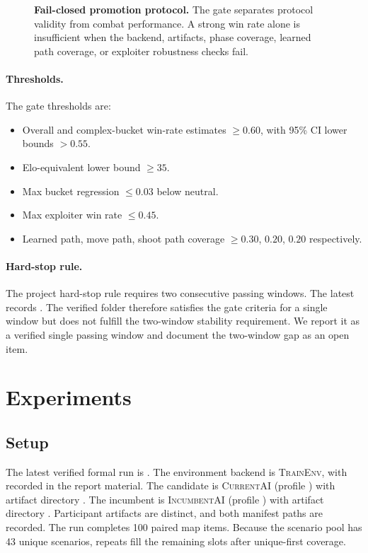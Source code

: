 \documentclass{article}
\newcommand{\env}{\textsc{TrainEnv}}
\newcommand{\currentai}{\textsc{CurrentAI}}
\newcommand{\incumbentai}{\textsc{IncumbentAI}}
\begin{document}
\begin{figure}[t]
  \centering
  
  \caption{\textbf{Fail-closed promotion protocol.} The gate separates protocol validity from combat performance. A strong win rate alone is insufficient when the backend, artifacts, phase coverage, learned path coverage, or exploiter robustness checks fail.}
  \label{fig:gate}
\end{figure}

\paragraph{Thresholds.}
The gate thresholds are:
\begin{itemize}
  \item Overall and complex-bucket win-rate estimates $\geq 0.60$, with 95\% CI lower bounds $> 0.55$.
  \item Elo-equivalent lower bound $\geq 35$.
  \item Max bucket regression $\leq 0.03$ below neutral.
  \item Max exploiter win rate $\leq 0.45$.
  \item Learned path, move path, shoot path coverage $\geq 0.30$, $0.20$, $0.20$ respectively.
\end{itemize}

\paragraph{Hard-stop rule.}
The project hard-stop rule requires two consecutive passing windows. The latest  records . The verified folder therefore satisfies the gate criteria for a single window but does not fulfill the two-window stability requirement. We report it as a verified single passing window and document the two-window gap as an open item.

\section{Experiments}

\subsection{Setup}

The latest verified formal run is . The environment backend is \env{}, with  recorded in the report material. The candidate is \currentai{} (profile ) with artifact directory . The incumbent is \incumbentai{} (profile ) with artifact directory . Participant artifacts are distinct, and both manifest paths are recorded. The run completes 100 paired map items. Because the scenario pool has 43 unique scenarios, repeats fill the remaining slots after unique-first coverage.
\end{document}
